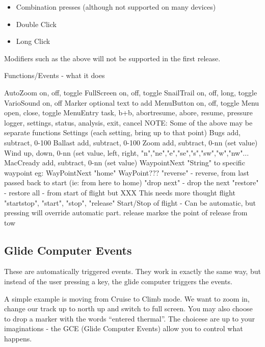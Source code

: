 \begin{itemize}
\item Combination presses (although not supported on many devices)
\item Double Click
\item Long Click
\end{itemize}

Modifiers such as the above will not be supported in the first release.

\begin{verb}
Functions/Events - what it does

AutoZoom		on, off, toggle 
FullScreen		on, off, toggle
SnailTrail 		on, off, long, toggle
VarioSound 		on, off
Marker 			optional text to add
MenuButton 		on, off, toggle
Menu			open, close, toggle
MenuEntry		task, b+b, abortresume, abore, resume, pressure
logger, settings, status, analysis, exit, cancel
NOTE: Some of the above may be separate functions
Settings		(each setting, bring up to that point)
Bugs			add, subtract, 0-100%
Ballast			add, subtract, 0-100%
Zoom			add, subtract, 0-nn (set value)
Wind			up, down, 0-nn (set value, left, right, "n","ne","e","se","s","sw","w","nw"...
MacCready		add, subtract, 0-nn (set value)
WaypointNext		"String" to specific waypoint
eg: WayPointNext "home"
WayPoint???		"reverse" - reverse, from last passed back to start (ie: from here to home)
"drop next" - drop the next
"restore" - restore all - from start of flight but 
XXX This needs more thought
flight 			"startstop", "start", "stop", "release"
Start/Stop of flight - Can be automatic, but pressing will override
automatic part.
release 		markse the point of release from tow
\end{verb}

\subsection{Glide Computer Events}

These are automatically triggered events. They work in exactly the
same way, but instead of the user pressing a key, the glide computer
triggers the events.

A simple example is moving from Cruise to Climb mode. We want to zoom
in, change our track up to north up and switch to full screen. You may
also choose to drop a marker with the words ``entered thermal''. The
choicese are up to your imaginations - the GCE (Glide Computer Events)
allow you to control what happens.

